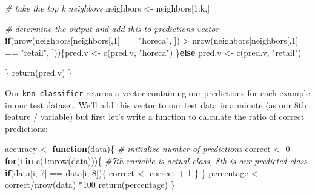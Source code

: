 \documentclass[
]{article}
\newenvironment{Shaded}{\begin{snugshade}}{\end{snugshade}}
\newcommand{\CommentTok}[1]{\textcolor[rgb]{0.56,0.35,0.01}{\textit{#1}}}
\newcommand{\ControlFlowTok}[1]{\textcolor[rgb]{0.13,0.29,0.53}{\textbf{#1}}}
\newcommand{\DecValTok}[1]{\textcolor[rgb]{0.00,0.00,0.81}{#1}}
\newcommand{\FunctionTok}[1]{\textcolor[rgb]{0.00,0.00,0.00}{#1}}
\newcommand{\NormalTok}[1]{#1}
\newcommand{\OtherTok}[1]{\textcolor[rgb]{0.56,0.35,0.01}{#1}}
\newcommand{\SpecialCharTok}[1]{\textcolor[rgb]{0.00,0.00,0.00}{#1}}
\newcommand{\StringTok}[1]{\textcolor[rgb]{0.31,0.60,0.02}{#1}}
\begin{document}
\begin{Shaded}
\begin{Highlighting}[]
    \CommentTok{\# take the top k neighbors}
\NormalTok{    neighbors }\OtherTok{\textless{}{-}}\NormalTok{ neighbors[}\DecValTok{1}\SpecialCharTok{:}\NormalTok{k,]}
    
    \CommentTok{\# determine the output and add this to predictions vector}
    \ControlFlowTok{if}\NormalTok{(}\FunctionTok{nrow}\NormalTok{(neighbors[neighbors[,}\DecValTok{1}\NormalTok{] }\SpecialCharTok{==} \StringTok{"horeca"}\NormalTok{, ]) }\SpecialCharTok{\textgreater{}} \FunctionTok{nrow}\NormalTok{(neighbors[neighbors[,}\DecValTok{1}\NormalTok{] }\SpecialCharTok{==} \StringTok{"retail"}\NormalTok{, ]))\{pred.v }\OtherTok{\textless{}{-}} \FunctionTok{c}\NormalTok{(pred.v, }\StringTok{"horeca"}\NormalTok{)}
\NormalTok{    \}}\ControlFlowTok{else}\NormalTok{ pred.v }\OtherTok{\textless{}{-}} \FunctionTok{c}\NormalTok{(pred.v, }\StringTok{"retail"}\NormalTok{)}
    
\NormalTok{  \}}
  \FunctionTok{return}\NormalTok{(pred.v)}
\NormalTok{\}}
\end{Highlighting}
\end{Shaded}

Our \texttt{knn\_classifier} returns a vector containing our predictions
for each example in our test dataset. We'll add this vector to our test
data in a minute (as our 8th feature / variable) but first let's write a
function to calculate the ratio of correct predictions:

\begin{Shaded}
\begin{Highlighting}[]
\NormalTok{accuracy }\OtherTok{\textless{}{-}} \ControlFlowTok{function}\NormalTok{(data)\{}
  \CommentTok{\# initialize number of predictions}
\NormalTok{  correct }\OtherTok{\textless{}{-}} \DecValTok{0}
  \ControlFlowTok{for}\NormalTok{(i }\ControlFlowTok{in} \FunctionTok{c}\NormalTok{(}\DecValTok{1}\SpecialCharTok{:}\FunctionTok{nrow}\NormalTok{(data)))\{}
    \CommentTok{\#7th variable is actual class, 8th is our predicted class}
    \ControlFlowTok{if}\NormalTok{(data[i, }\DecValTok{7}\NormalTok{] }\SpecialCharTok{==}\NormalTok{ data[i, }\DecValTok{8}\NormalTok{])\{}
\NormalTok{      correct }\OtherTok{\textless{}{-}}\NormalTok{ correct }\SpecialCharTok{+} \DecValTok{1}
\NormalTok{    \}}
\NormalTok{  \}}
\NormalTok{  percentage }\OtherTok{\textless{}{-}}\NormalTok{ correct}\SpecialCharTok{/}\FunctionTok{nrow}\NormalTok{(data) }\SpecialCharTok{*}\DecValTok{100}
  \FunctionTok{return}\NormalTok{(percentage)}
\NormalTok{\}}
\end{Highlighting}
\end{Shaded}
\end{document}
